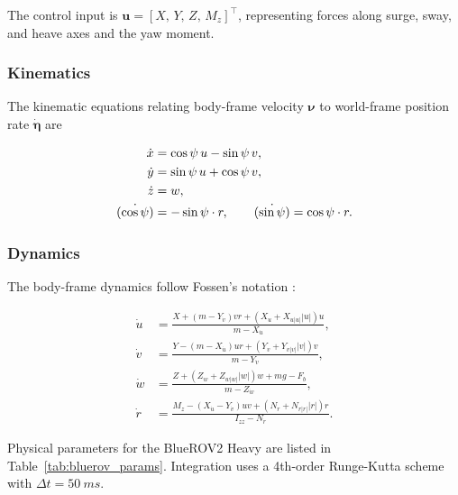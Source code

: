 \documentclass[journal]{IEEEtran}
\newcommand{\bu}{\bm{u}}
\newcommand{\bnu}{\bm{\nu}}
\newcommand{\boldeta}{\bm{\eta}}
\begin{document}
The control input is $\bu = [X,\, Y,\, Z,\, M_z]^{\top}$, representing
forces along surge, sway, and heave axes and the yaw moment.

\subsubsection{Kinematics}

The kinematic equations relating body-frame velocity $\bnu$ to world-frame
position rate $\dot{\boldeta}$ are

\begin{align}
  \dot{x}       &= \cos\psi\, u - \sin\psi\, v, \notag\\
  \dot{y}       &= \sin\psi\, u + \cos\psi\, v, \notag\\
  \dot{z}       &= w, \notag\\
  \dot{(\cos\psi)} &= -\sin\psi\cdot r, \qquad
  \dot{(\sin\psi)}  =  \cos\psi\cdot r.
  \label{eq:kinematics}
\end{align}

\subsubsection{Dynamics}

The body-frame dynamics follow Fossen's notation
\cite{fossen2011handbook}:

\begin{align}
  \dot{u} &= \frac{X + (m{-}Y_{\dot{v}})vr + (X_u + X_{u|u|}|u|)u}
                  {m - X_{\dot{u}}},                          \label{eq:surge}\\
  \dot{v} &= \frac{Y - (m{-}X_{\dot{u}})ur + (Y_v + Y_{v|v|}|v|)v}
                  {m - Y_{\dot{v}}},                          \label{eq:sway}\\
  \dot{w} &= \frac{Z + (Z_w + Z_{w|w|}|w|)w + mg - F_b}
                  {m - Z_{\dot{w}}},                          \label{eq:heave}\\
  \dot{r} &= \frac{M_z - (X_{\dot{u}}{-}Y_{\dot{v}})uv + (N_r + N_{r|r|}|r|)r}
                  {I_{zz} - N_{\dot{r}}}.                     \label{eq:yaw}
\end{align}

Physical parameters for the BlueROV2 Heavy are listed in
Table~\ref{tab:bluerov_params}. Integration uses a 4th-order Runge-Kutta
scheme with $\Delta t = \SI{50}{ms}$.
\end{document}
